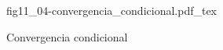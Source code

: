 \begin{figure}[h]
\centering
\def\svgwidth{0.5\textwidth}
{fig11_04-convergencia_condicional.pdf_tex}
\caption{Convergencia condicional}
\label{fig11_04-convergencia_condicional}
\end{figure}